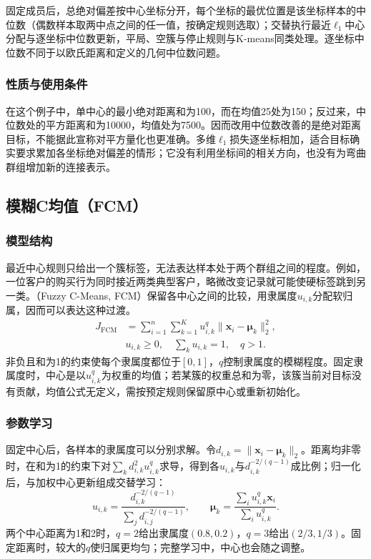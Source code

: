 固定成员后，总绝对偏差按中心坐标分开，每个坐标的最优位置是该坐标样本的中位数（偶数样本取两中点之间的任一值，按确定规则选取）；交替执行最近$\ell_1$中心分配与逐坐标中位数更新，平局、空簇与停止规则与K-means同类处理。逐坐标中位数不同于以欧氏距离和定义的几何中位数问题。

\subsubsection{性质与使用条件}

在这个例子中，单中心的最小绝对距离和为100，而在均值25处为150；反过来，中位数处的平方距离和为10000，均值处为7500。因而改用中位数改善的是绝对距离目标，不能据此宣称对平方量化也更准确。多维$\ell_1$损失逐坐标相加，适合目标确实要求累加各坐标绝对偏差的情形；它没有利用坐标间的相关方向，也没有为弯曲群组增加新的连接表示。
\subsection{模糊C均值（FCM）}

\subsubsection{模型结构}

最近中心规则只给出一个簇标签，无法表达样本处于两个群组之间的程度。例如，一位客户的购买行为同时接近两类典型客户，略微改变记录就可能使硬标签跳到另一类。（Fuzzy C-Means, FCM）保留各中心之间的比较，用隶属度$u_{i,k}$分配软归属，因而可以表达这种过渡。
\begin{equation}
 \begin{aligned}
 J_{\mathrm{FCM}}
 &=\sum_{i=1}^n\sum_{k=1}^K
 u_{i,k}^{q}\lVert\bm{x}_i-\bm{\mu}_k\rVert_2^2,
 \\
 &u_{i,k}\geq0,\quad \sum_k u_{i,k}=1,\quad q>1.
 \end{aligned}
 \label{eq:clustering-fcm}
\end{equation}
非负且和为1的约束使每个隶属度都位于$[0,1]$，$q$控制隶属度的模糊程度。固定隶属度时，中心是以$u_{i,k}^q$为权重的均值；若某簇的权重总和为零，该簇当前对目标没有贡献，均值公式无定义，需按预定规则保留原中心或重新初始化。

\subsubsection{参数学习}

固定中心后，各样本的隶属度可以分别求解。令$d_{i,k}=\lVert\bm x_i-\bm\mu_k\rVert_2$。距离均非零时，在和为1的约束下对$\sum_kd_{i,k}^2u_{i,k}^q$求导，得到各$u_{i,k}$与$d_{i,k}^{-2/(q-1)}$成比例；归一化后，与加权中心更新组成交替学习：
\[
 u_{i,k}=\frac{d_{i,k}^{-2/(q-1)}}{\sum_jd_{i,j}^{-2/(q-1)}},
 \qquad
 \bm\mu_k=\frac{\sum_i u_{i,k}^q\bm x_i}{\sum_i u_{i,k}^q}.
\]
两个中心距离为1和2时，$q=2$给出隶属度$(0.8,0.2)$，$q=3$给出$(2/3,1/3)$。固定距离时，较大的$q$使归属更均匀；完整学习中，中心也会随之调整。

